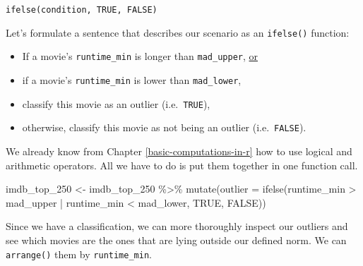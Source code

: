 \documentclass[
]{book}
\newenvironment{Shaded}{\begin{snugshade}}{\end{snugshade}}
\newcommand{\AttributeTok}[1]{\textcolor[rgb]{0.77,0.63,0.00}{#1}}
\newcommand{\ConstantTok}[1]{\textcolor[rgb]{0.00,0.00,0.00}{#1}}
\newcommand{\FunctionTok}[1]{\textcolor[rgb]{0.00,0.00,0.00}{#1}}
\newcommand{\NormalTok}[1]{#1}
\newcommand{\OtherTok}[1]{\textcolor[rgb]{0.56,0.35,0.01}{#1}}
\newcommand{\SpecialCharTok}[1]{\textcolor[rgb]{0.00,0.00,0.00}{#1}}
\begin{document}
\leavevmode\hypertarget{ifelse-function}{}%
\texttt{ifelse(condition,\ TRUE,\ FALSE)}

Let's formulate a sentence that describes our scenario as an \texttt{ifelse()} function:

\begin{itemize}
\item
  If a movie's \texttt{runtime\_min} is longer than \texttt{mad\_upper}, \underline{or}
\item
  if a movie's \texttt{runtime\_min} is lower than \texttt{mad\_lower},
\item
  classify this movie as an outlier (i.e.~\texttt{TRUE}),
\item
  otherwise, classify this movie as not being an outlier (i.e.~\texttt{FALSE}).
\end{itemize}

We already know from Chapter \ref{basic-computations-in-r} how to use logical and arithmetic operators. All we have to do is put them together in one function call.

\begin{Shaded}
\begin{Highlighting}[]
\NormalTok{imdb\_top\_250 }\OtherTok{\textless{}{-}}\NormalTok{ imdb\_top\_250 }\SpecialCharTok{\%\textgreater{}\%}
  \FunctionTok{mutate}\NormalTok{(}\AttributeTok{outlier =} \FunctionTok{ifelse}\NormalTok{(runtime\_min }\SpecialCharTok{\textgreater{}}\NormalTok{ mad\_upper }\SpecialCharTok{|}\NormalTok{ runtime\_min }\SpecialCharTok{\textless{}}\NormalTok{ mad\_lower,}
                          \ConstantTok{TRUE}\NormalTok{, }\ConstantTok{FALSE}\NormalTok{))}
\end{Highlighting}
\end{Shaded}

Since we have a classification, we can more thoroughly inspect our outliers and see which movies are the ones that are lying outside our defined norm. We can \texttt{arrange()} them by \texttt{runtime\_min}.
\end{document}
